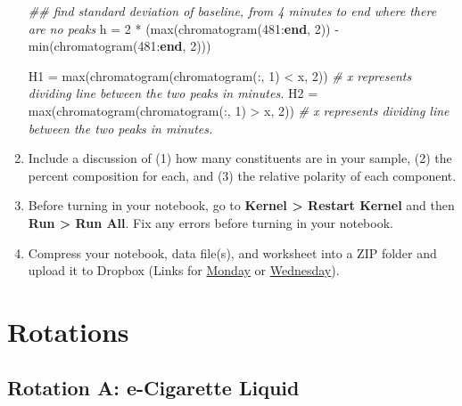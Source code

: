 \documentclass[]{tufte-book}
\newenvironment{Shaded}{}{}
\newcommand{\CommentTok}[1]{\textcolor[rgb]{0.38,0.63,0.69}{\textit{#1}}}
\newcommand{\ControlFlowTok}[1]{\textcolor[rgb]{0.00,0.44,0.13}{\textbf{#1}}}
\newcommand{\FloatTok}[1]{\textcolor[rgb]{0.25,0.63,0.44}{#1}}
\newcommand{\FunctionTok}[1]{\textcolor[rgb]{0.02,0.16,0.49}{#1}}
\newcommand{\NormalTok}[1]{#1}
\newcommand{\OperatorTok}[1]{\textcolor[rgb]{0.40,0.40,0.40}{#1}}
\begin{document}
\begin{enumerate}
\begin{Shaded}
\begin{Highlighting}[]
\CommentTok{## find standard deviation of baseline, from 4 minutes to end where there are no peaks}
\NormalTok{h }\OperatorTok{=} \FloatTok{2} \OperatorTok{*}\NormalTok{ (}\FunctionTok{max}\NormalTok{(chromatogram(}\FloatTok{481}\OperatorTok{:}\ControlFlowTok{end}\OperatorTok{,} \FloatTok{2}\NormalTok{)) }\OperatorTok{-} \FunctionTok{min}\NormalTok{(chromatogram(}\FloatTok{481}\OperatorTok{:}\ControlFlowTok{end}\OperatorTok{,} \FloatTok{2}\NormalTok{)))}

\NormalTok{H1 }\OperatorTok{=} \FunctionTok{max}\NormalTok{(chromatogram(chromatogram(}\OperatorTok{:,} \FloatTok{1}\NormalTok{) }\OperatorTok{<}\NormalTok{ x}\OperatorTok{,} \FloatTok{2}\NormalTok{)) }\CommentTok{# x represents dividing line between the two peaks in minutes.}
\NormalTok{H2 }\OperatorTok{=} \FunctionTok{max}\NormalTok{(chromatogram(chromatogram(}\OperatorTok{:,} \FloatTok{1}\NormalTok{) }\OperatorTok{>}\NormalTok{ x}\OperatorTok{,} \FloatTok{2}\NormalTok{)) }\CommentTok{# x represents dividing line between the two peaks in minutes.}
\end{Highlighting}
\end{Shaded}
\item
  Include a discussion of (1) how many constituents are in your sample, (2) the percent composition for each, and (3) the relative polarity of each component.
\item
  Before turning in your notebook, go to \textbf{Kernel \textgreater{} Restart Kernel} and then \textbf{Run \textgreater{} Run All}. Fix any errors before turning in your notebook.
\item
  Compress your notebook, data file(s), and worksheet into a ZIP folder and upload it to Dropbox (Links for \href{https://alphonse.github.io/devel/chem370/assignments/submissions-monday.html}{Monday} or \href{https://alphonse.github.io/devel/chem370/assignments/submissions-wednesday.html}{Wednesday}).
\end{enumerate}

\hypertarget{part-rotations}{%
\part{Rotations}\label{part-rotations}}

\hypertarget{rotation-a-e-cigarette-liquid}{%
\chapter{Rotation A: e-Cigarette Liquid}\label{rotation-a-e-cigarette-liquid}}
\end{document}
